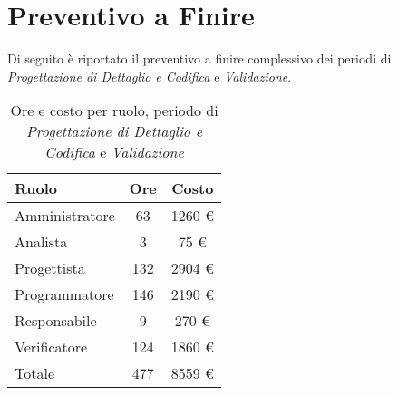 \section{Preventivo a Finire}
Di seguito è riportato il preventivo a finire complessivo dei periodi di \textit{Progettazione di Dettaglio e Codifica} e \textit{Validazione}.

\begin{table}[H]
	\centering
	\begin{tabular}{ l c c }
		\textbf{Ruolo} & \textbf{Ore} & \textbf{Costo} \\
		\hline
		Amministratore & 63 & 1260 \euro{} \\
		Analista & 3 & 75 \euro{} \\
		Progettista & 132 & 2904 \euro{} \\
		Programmatore & 146 & 2190 \euro{} \\
		Responsabile & 9 & 270 \euro{} \\
		Verificatore & 124 & 1860 \euro{} \\
		\hline
		Totale & 477 & 8559 \euro{} \\
		\hline
	\end{tabular}
	\caption{Ore e costo per ruolo, periodo di \textit{Progettazione di Dettaglio e Codifica} e \textit{Validazione}}
\end{table}

\newpage